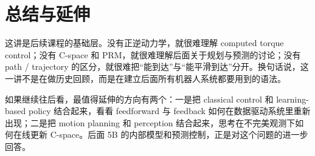 \documentclass[a4paper]{article}
\begin{document}
\section{总结与延伸}
这讲是后续课程的基础层。没有正逆动力学，就很难理解 computed torque control；没有 C-space 和 PRM，就很难理解后面关于规划与预测的讨论；没有 path / trajectory 的区分，就很难把“能到达”与“能平滑到达”分开。换句话说，这一讲不是在做历史回顾，而是在建立后面所有机器人系统都要用到的语法。

如果继续往后看，最值得延伸的方向有两个：一是把 classical control 和 learning-based policy 结合起来，看看 feedforward 与 feedback 如何在数据驱动系统里重新出现；二是把 motion planning 和 perception 结合起来，思考在不完美观测下如何在线更新 C-space。后面 5B 的内部模型和预测控制，正是对这个问题的进一步回答。
\end{document}
